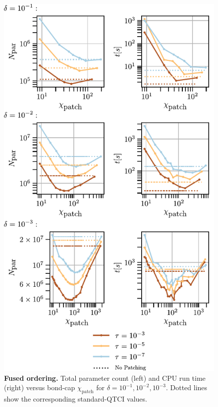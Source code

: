 \begin{figure}[htbp]
    \centering
    \includegraphics{figures/2DGreenMemoryTimeFused.pdf}
    \caption{ \textbf{Fused ordering.} Total parameter count (left) and CPU run time (right) versus bond-cap \(\chi_{\text{patch}}\) for \(\delta=10^{-1},10^{-2},10^{-3}\). Dotted lines show the corresponding standard-QTCI values. }
    \label{fig:memoryTime2DGreenFused}
\end{figure}

